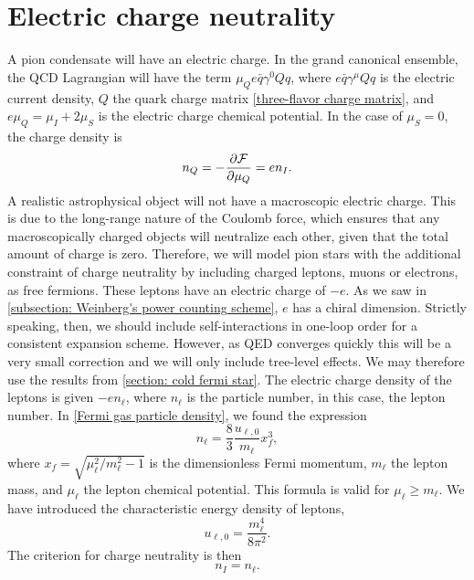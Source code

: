\section{Electric charge neutrality}
\label{section: charge neturality}


A pion condensate will have an electric charge.
In the grand canonical ensemble, the QCD Lagrangian will have the term  $\mu_Q e\bar q \gamma^0 Q q$, where $e \bar q \gamma^\mu Q q$ is the electric current density, $Q$ the quark charge matrix \autoref{three-flavor charge matrix}, and $e \mu_Q = \mu_I + 2 \mu_S$ is the electric charge chemical potential.
In the case of $\mu_S = 0$, the charge density is
%
\begin{equation}
    n_Q = - \pdv{\mathcal{F}}{\mu_Q} = e n_I.
\end{equation}
%
A realistic astrophysical object will not have a macroscopic electric charge.
This is due to the long-range nature of the Coulomb force, which ensures that any macroscopically charged objects will neutralize each other, given that the total amount of charge is zero.
Therefore, we will model pion stars with the additional constraint of charge neutrality by including charged leptons, muons or electrons, as free fermions.
These leptons have an electric charge of $- e$.
As we saw in \autoref{subsection: Weinberg's power counting scheme}, $e$ has a chiral dimension.
Strictly speaking, then, we should include self-interactions in one-loop order for a consistent expansion scheme.
However, as QED converges quickly this will be a very small correction and we will only include tree-level effects.
We may therefore use the results from \autoref{section: cold fermi star}.
The electric charge density of the leptons is given $- e n_\ell$, where $n_\ell$ is the particle number, in this case, the lepton number.
In \autoref{Fermi gas particle density}, we found the expression
%
\begin{equation}
    \label{lepton density}
    n_{\ell} = \frac{8}{3} 
    \frac{u_{\ell, 0}}{m_\ell} x_f^3,
\end{equation}
%
where $x_f = \sqrt{ {\mu_\ell^2}/{m_\ell^2} - 1}$ is the dimensionless Fermi momentum, $m_\ell$ the lepton mass, and $\mu_\ell$ the lepton chemical potential.
This formula is valid for $\mu_\ell \geq m_\ell$.
We have introduced the characteristic energy density of leptons,
%
\begin{equation}
    u_{\ell, 0} = \frac{m^4_\ell}{8 \pi^2}.
\end{equation}
%
The criterion for charge neutrality is then
%
\begin{equation}
    \label{criterion charge neutrality}
    n_I = n_\ell.
\end{equation}
